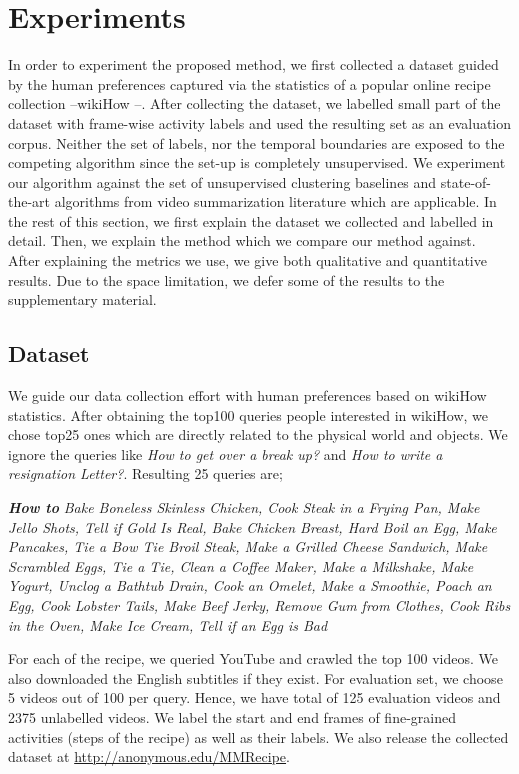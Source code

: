 \section{Experiments}
In order to experiment the proposed method, we first collected a dataset guided by the human preferences captured via the statistics of a popular online recipe collection --wikiHow \cite{wikiHow}--. After collecting the dataset, we labelled small part of the dataset with frame-wise activity labels and used the resulting set as an evaluation corpus. Neither the set of labels, nor the temporal boundaries are exposed to the competing algorithm since the set-up is completely unsupervised. We experiment our algorithm against the set of unsupervised clustering baselines and state-of-the-art algorithms from video summarization literature which are applicable. In the rest of this section, we first explain the dataset we collected and labelled in detail. Then, we explain the method which we compare our method against. After explaining the metrics we use, we give both qualitative and quantitative results. Due to the space limitation, we defer some of the results to the supplementary material.

\subsection{Dataset}
\label{dataset:sec}
We guide our data collection effort with human preferences based on wikiHow \cite{wikiHow} statistics. After obtaining the top100 queries people interested in wikiHow, we chose top25 ones which are directly related to the physical world and objects. We ignore the queries like \emph{How to get over a break up‏?‎} and \emph{How to write a resignation Letter?}. Resulting 25 queries are;


\emph{\textbf{How to}}\footnotesize
\emph{Bake Boneless Skinless Chicken, Cook Steak in a Frying Pan, Make Jello Shots, Tell if Gold Is Real, Bake Chicken Breast, Hard Boil an Egg, Make Pancakes, Tie a Bow Tie
Broil Steak, Make a Grilled Cheese Sandwich, Make Scrambled Eggs, Tie a Tie, Clean a Coffee Maker, Make a Milkshake, Make Yogurt, Unclog a Bathtub Drain, Cook an Omelet,
Make a Smoothie, Poach an Egg, Cook Lobster Tails, Make Beef Jerky, Remove Gum from Clothes, Cook Ribs in the Oven, Make Ice Cream, Tell if an Egg is Bad}
\normalsize

For each of the recipe, we queried YouTube and crawled the top 100 videos. We also downloaded the English subtitles if they exist. For evaluation set, we choose 5 videos out of 100 per query. Hence, we have total of 125 evaluation videos and 2375 unlabelled videos. We label the start and end frames of fine-grained activities (\ie steps of the recipe) as well as their labels. We also release the collected dataset at \url{http://anonymous.edu/MMRecipe}.

